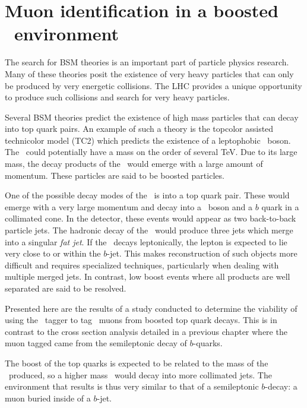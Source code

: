\newcommand{\kT}{\ensuremath{k_{\textrm{T}}}}
\newcommand{\mzp}{\ensuremath{m_{\Zprime}}}
\newcommand{\eff}[2]{\ensuremath{\epsilon_{#1}^{#2}}}

\chapter{Muon identification in a boosted \ttbar\ environment}\label{ch:Boosted}

The search for BSM theories is an important part of particle physics research. Many of these theories posit the existence of very heavy particles that can only be produced by very energetic collisions. The LHC provides a unique opportunity to produce such collisions and search for very heavy particles. 

Several BSM theories predict the existence of high mass particles that can decay into top quark pairs. An example of such a theory is the topcolor assisted technicolor model (TC2) which predicts the existence of a leptophobic \Zprime\ boson. The \Zprime\ could potentially have a mass on the order of several \si{TeV}. Due to its large mass, the decay products of the \Zprime\ would emerge with a large amount of momentum. These particles are said to be boosted particles.

One of the possible decay modes of the \Zprime\ is into a top quark pair. These would emerge with a very large momentum and decay into a \W\ boson and a $b$ quark in a collimated cone. In the detector, these events would appear as two back-to-back particle jets. The hadronic decay of the \W\ would produce three jets which merge into a singular \emph{fat jet}. If the \W\ decays leptonically, the lepton is expected to lie very close to or within the $b$-jet. This makes reconstruction of such objects more difficult and requires specialized techniques, particularly when dealing with multiple merged jets. In contrast, low boost events where all products are well separated are said to be resolved.

Presented here are the results of a study conducted to determine the viability of using the \xsm\ tagger to tag \W\ muons from boosted top quark decays. This is in contrast to the cross section analysis detailed in a previous chapter where the muon tagged came from the semileptonic decay of $b$-quarks.

The boost of the top quarks is expected to be related to the mass of the \Zprime\ produced, so a higher mass \Zprime\ would decay into more collimated jets. The environment that results is thus very similar to that of a semileptonic $b$-decay: a muon buried inside of a $b$-jet.

